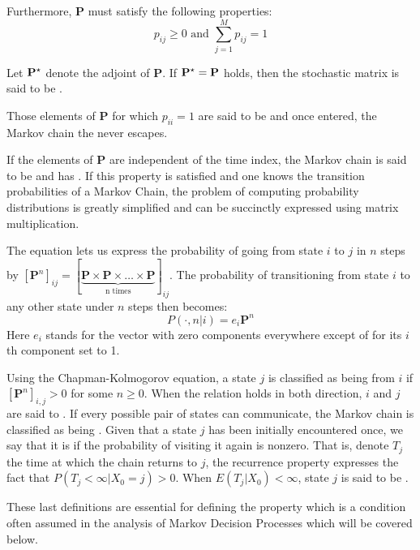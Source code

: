 Furthermore, $\mathbf{P} $ must satisfy the following properties:
\begin{equation}
p_{ij} \geq 0 \mbox{ and } \sum_{j=1}^M p_{ij} =1 
\end{equation}

Let $\mathbf{P}^\star$ denote the adjoint of $\mathbf{P}$. If $\mathbf{P}^\star = \mathbf{P}$ holds, then the stochastic matrix is said to be . 

Those elements of $\mathbf{P}$ for which $p_{ii} = 1$ are said to be
 and once entered, the Markov chain the never escapes.

If the elements of $\mathbf{P} $ are independent of the time index, the
Markov chain is said to be  and has . If this property is satisfied and one knows the transition probabilities of
a Markov Chain, the problem of computing probability distributions is greatly
simplified and can be succinctly expressed using matrix multiplication.  

The  equation lets us express the probability of
going from state $i$ to $j$ in $n$ steps by $[\mathbf{P}^n]_{ij} = [
\underbrace{\mathbf{P} \times \mathbf{P} \times \dots \times \mathbf{P}}_{\text{n
times}} ]_{ij}$. The probability of transitioning from state $i$ to any other state under
$n$ steps then becomes:
\begin{equation}
P( \cdot, n | i) = e_i \mathbf{P}^n
\end{equation}
Here $e_i$ stands for the vector with zero components everywhere except of for its
$i$th component set to 1. 

Using the Chapman-Kolmogorov equation, a state $j$ is classified as being
 from $i$ if $[\mathbf{P}^n]_{i,j} > 0$ for some $n \geq 0$. When
the relation holds in both direction, $i$ and $j$ are said to . If
every possible pair of states can communicate, the Markov chain is classified as being
. Given that a state $j$ has been initially encountered once, we
say that it is  if the probability of visiting it again is nonzero. That
is, denote $T_j$ the time at which the chain returns to $j$, the recurrence property
expresses the fact that $P(T_j < \infty | X_0 = j) > 0$. When $E(T_j | X_0) < \infty$,
state $j$ is said to be .

These last definitions are essential for defining the 
property which is a condition often assumed in the analysis of Markov Decision Processes which will be covered below. 

